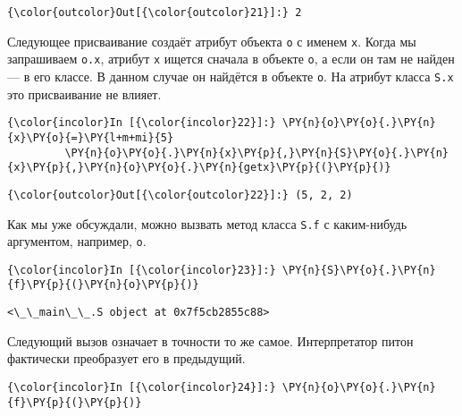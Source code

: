             \begin{Verbatim}[commandchars=\\\{\}]
{\color{outcolor}Out[{\color{outcolor}21}]:} 2
\end{Verbatim}
        
    Следующее присваивание создаёт атрибут объекта \texttt{o} с именем
\texttt{x}. Когда мы запрашиваем \texttt{o.x}, атрибут \texttt{x} ищется
сначала в объекте \texttt{o}, а если он там не найден --- в его классе. В
данном случае он найдётся в объекте \texttt{o}. На атрибут класса
\texttt{S.x} это присваивание не влияет.

    \begin{Verbatim}[commandchars=\\\{\}]
{\color{incolor}In [{\color{incolor}22}]:} \PY{n}{o}\PY{o}{.}\PY{n}{x}\PY{o}{=}\PY{l+m+mi}{5}
         \PY{n}{o}\PY{o}{.}\PY{n}{x}\PY{p}{,}\PY{n}{S}\PY{o}{.}\PY{n}{x}\PY{p}{,}\PY{n}{o}\PY{o}{.}\PY{n}{getx}\PY{p}{(}\PY{p}{)}
\end{Verbatim}

            \begin{Verbatim}[commandchars=\\\{\}]
{\color{outcolor}Out[{\color{outcolor}22}]:} (5, 2, 2)
\end{Verbatim}
        
    Как мы уже обсуждали, можно вызвать метод класса \texttt{S.f} с
каким-нибудь аргументом, например, \texttt{o}.

    \begin{Verbatim}[commandchars=\\\{\}]
{\color{incolor}In [{\color{incolor}23}]:} \PY{n}{S}\PY{o}{.}\PY{n}{f}\PY{p}{(}\PY{n}{o}\PY{p}{)}
\end{Verbatim}

    \begin{Verbatim}[commandchars=\\\{\}]
<\_\_main\_\_.S object at 0x7f5cb2855c88>

    \end{Verbatim}

    Следующий вызов означает в точности то же самое. Интерпретатор питон
фактически преобразует его в предыдущий.

    \begin{Verbatim}[commandchars=\\\{\}]
{\color{incolor}In [{\color{incolor}24}]:} \PY{n}{o}\PY{o}{.}\PY{n}{f}\PY{p}{(}\PY{p}{)}
\end{Verbatim}


